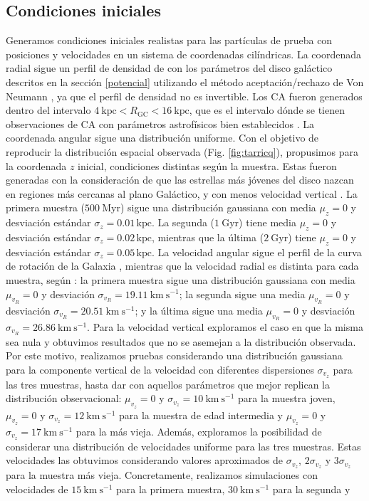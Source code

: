 \documentclass[baaa]{baaa}
\begin{document}
\subsection{Condiciones iniciales}\label{condiniciales}

Generamos condiciones iniciales realistas para las partículas de prueba con posiciones y velocidades en un sistema de coordenadas cilíndricas. La coordenada radial sigue un perfil de densidad de \cite{MiyamotoNagai} con los parámetros del disco galáctico descritos en la sección \ref{potencial} utilizando el método aceptación/rechazo de Von Neumann \citep{Numerical_Recipes}, ya que el perfil de densidad no es invertible. Los CA fueron generados dentro del intervalo $4~\mathrm{kpc} < R_{\mathrm{GC}} < 16~\mathrm{kpc}$, que es el intervalo dónde se tienen observaciones de CA con parámetros astrofísicos bien establecidos \citep{Dias}. La coordenada angular sigue una distribución uniforme. Con el objetivo de reproducir la distribución espacial observada (Fig. \ref{fig:tarricq}), propusimos para la coordenada $z$ inicial, condiciones distintas según la muestra. Estas fueron generadas con la consideración de que las estrellas más jóvenes del disco nazcan en regiones más cercanas al plano Galáctico, y con menos velocidad vertical \citep{ting2019vertical}. La primera muestra ($500~\mathrm{Myr}$) sigue una distribución gaussiana con media $\mu_z = 0$ y desviación estándar $\sigma_z = 0.01 \, \mathrm{kpc}$. La segunda ($1~\mathrm{Gyr}$) tiene media $\mu_z = 0$ y desviación estándar $\sigma_z = 0.02 \, \mathrm{kpc}$, mientras que la última ($2~\mathrm{Gyr}$) tiene $\mu_z = 0$ y desviación estándar $\sigma_z = 0.05 \, \mathrm{kpc}$. La velocidad angular sigue el perfil de la curva de rotación de la Galaxia \citep{Monteiro}, mientras que la velocidad radial es distinta para cada muestra, según \cite{Tarricq}: la primera muestra sigue una distribución gaussiana con media $\mu_{v_R} = 0$ y desviación $\sigma_{v_R} = 19.11~\mathrm{km~s^{-1}}$; la segunda sigue una media $\mu_{v_R} = 0$ y desviación $\sigma_{v_R} = 20.51~\mathrm{km~s^{-1}}$; y la última sigue una media $\mu_{v_R} = 0$ y desviación $\sigma_{v_R} = 26.86~\mathrm{km~s^{-1}}$. Para la velocidad vertical exploramos el caso en que la misma sea nula \citep{Martinez-Medina} y obtuvimos resultados que no se asemejan a la distribución observada. Por este motivo, realizamos pruebas considerando una distribución gaussiana para la componente vertical de la velocidad con diferentes dispersiones $\sigma_{v_z}$ para las tres muestras, hasta dar con aquellos parámetros que mejor replican la distribución observacional: $\mu_{v_z} = 0$ y $\sigma_{v_z} = 10~\mathrm{km~s^{-1}}$ para la muestra joven, $\mu_{v_z} = 0$ y $\sigma_{v_z} = 12~\mathrm{km~s^{-1}}$ para la muestra de edad intermedia y $\mu_{v_z} = 0$ y $\sigma_{v_z} = 17~\mathrm{km~s^{-1}}$ para la más vieja. Además, exploramos la posibilidad de considerar una distribución de velocidades uniforme para las tres muestras. Estas velocidades las obtuvimos considerando valores aproximados de $\sigma_{v_z}$, $2\sigma_{v_z}$ y $3\sigma_{v_z}$ para la muestra más vieja. Concretamente, realizamos simulaciones con velocidades de $15~\mathrm{km~s^{-1}}$ para la primera muestra, $30~\mathrm{km~s^{-1}}$ para la segunda y 
\end{document}

